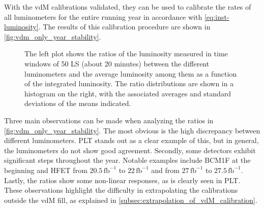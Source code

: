 

With the vdM calibrations validated, they can be used to calibrate the rates of all luminometers for the entire running year in accordance with \autoref{eq:inst-luminosity}. The results of this calibration procedure are shown in \autoref{fig:vdm_only_year_stability}.

\begin{figure}[!htb]
	\centering
	\caption{The left plot shows the ratios of the luminosity measured in time windows of 50 LS (about 20 minutes) between the different luminometers and the average luminosity among them as a function of the integrated luminosity. The ratio distributions are shown in a histogram on the right, with the associated averages and standard deviations of the means indicated.}
	\label{fig:vdm_only_year_stability}
\end{figure}

Three main observations can be made when analyzing the ratios in \autoref{fig:vdm_only_year_stability}. The most obvious is the high discrepancy between different luminometers. PLT stands out as a clear example of this, but in general, the luminometers do not show good agreement. Secondly, some detectors exhibit significant steps throughout the year. Notable examples include BCM1F at the beginning and HFET from \(20.5 \, \text{fb}^{-1}\) to \(22 \, \text{fb}^{-1}\) and from \(27 \, \text{fb}^{-1}\) to \(27.5 \, \text{fb}^{-1}\). Lastly, the ratios show some non-linear responses, as is clearly seen in PLT. These observations highlight the difficulty in extrapolating the calibrations outside the vdM fill, as explained in \autoref{subsec:extrapolation_of_vdM_calibration}.

